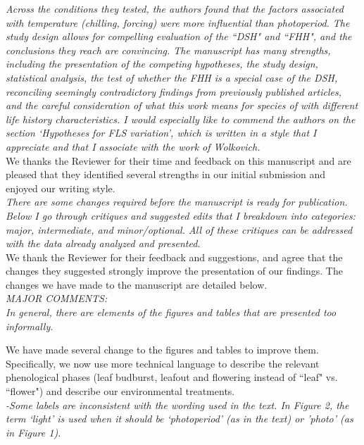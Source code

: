 \documentclass[11pt]{article}
\begin{document}
\emph{Across the conditions they tested, the authors found that the factors associated with temperature (chilling, forcing) were more influential than photoperiod. The study design allows for compelling evaluation of the ``DSH" and ``FHH", and the conclusions they reach are convincing. The manuscript has many strengths, including the presentation of the competing hypotheses, the study design, statistical analysis, the test of whether the FHH is a special case of the DSH, reconciling seemingly contradictory findings from previously published articles, and the careful consideration of what this work means for species of with different life history characteristics. I would especially like to commend the authors on the section `Hypotheses for FLS variation', which is written in a style that I appreciate and that I associate with the work of Wolkovich.}\\

\noindent We thanks the Reviewer for their time and feedback on this manuscript and are pleased that they identified several strengths in our initial submission and enjoyed our writing style.\\

\emph{There are some changes required before the manuscript is ready for publication. Below I go through critiques and suggested edits that I breakdown into categories: major, intermediate, and minor/optional. All of these critiques can be addressed with the data already analyzed and presented.}\\

\noindent We thank the Reviewer for their feedback and suggestions, and agree that the changes they suggested strongly improve the presentation of our findings. The changes we have made to the manuscript are detailed below.\\

\emph{MAJOR COMMENTS:\\
In general, there are elements of the figures and tables that are presented too informally.}

\noindent We have made several change to the figures and tables to improve them. Specifically, we now use more technical language to describe the relevant phenological phases (leaf budburst, leafout and flowering instead of ``leaf" vs. ``flower") and describe our environmental treatments.  \\

\emph{-Some labels are inconsistent with the wording used in the text. In Figure 2, the term `light' is used when it should be `photoperiod' (as in the text) or 'photo' (as in Figure 1).}\\
\end{document}
